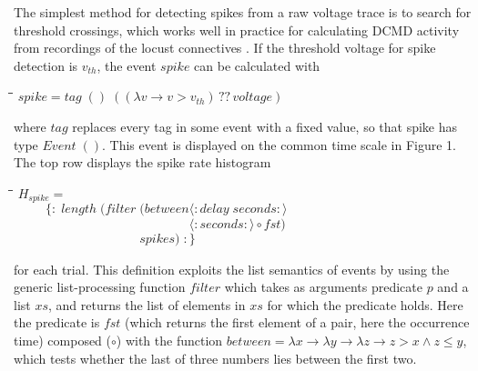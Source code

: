 \documentclass[11pt]{article}
\newlength{\lwidth}\setlength{\lwidth}{4.5cm}
\newlength{\cwidth}\setlength{\cwidth}{8mm} %
\newcommand{\Conid}[1]{\mathit{#1}}
\newcommand{\Varid}[1]{\mathit{#1}}
\renewcommand{\leq}{\leqslant}
\begin{document}
The simplest method for detecting spikes from a raw voltage trace is
to search for threshold crossings, which works well in
practice for calculating DCMD activity from recordings of the locust
connectives \citep{Gabbiani2001}. If the threshold voltage for spike
detection is \ensuremath{v_{th}}, the event \ensuremath{\Varid{spike}} can be calculated with
\begin{tabbing}
\qquad\=\hspace{\lwidth}\=\hspace{\cwidth}\=\+\kill
${\Varid{spike}\mathrel{=}\Varid{tag}\;()\;((\lambda \Varid{v}\to \Varid{v}\mathbin{>}v_{th})\,??\,\Varid{voltage})}$
\end{tabbing}where \ensuremath{\Varid{tag}} replaces every tag in some event with a fixed value, so
that spike has type \ensuremath{\Conid{Event}\;()}. This event is displayed on the common
time scale in Figure 1. The top row displays the spike rate histogram
\begin{tabbing}
\qquad\=\hspace{\lwidth}\=\hspace{\cwidth}\=\+\kill
${H_{spike}\mathrel{=}}$\\
${\phantom{H_{spike}\mbox{}}\{\!:\!\;\Varid{length}\;(\Varid{filter}\;(\Varid{between}\langle:\Varid{delay}\;\Varid{seconds}:\rangle}$\\
${\phantom{H_{spike}\mbox{}}\phantom{\{\!:\!\;\Varid{length}\;(\Varid{filter}\;(\Varid{between}\mbox{}}\langle:\Varid{seconds}:\rangle\mathbin{\circ}\Varid{fst})\;}$\\
${\phantom{H_{spike}\mbox{}}\phantom{\{\!:\!\;\Varid{length}\;(\Varid{filter}\;\mbox{}}\Varid{spikes})\;\!:\!\}}$
\end{tabbing}for each trial. This definition exploits the list semantics of events
by using the generic list-processing function \ensuremath{\Varid{filter}} which takes as
arguments predicate \ensuremath{\Varid{p}} and a list \ensuremath{\Varid{xs}}, and returns the list of
elements in \ensuremath{\Varid{xs}} for which the predicate holds. Here the predicate is
\ensuremath{\Varid{fst}} (which returns the first element of a pair, here the occurrence
time) composed (\ensuremath{\mathbin{\circ}}) with the function \ensuremath{\Varid{between}\mathrel{=}\lambda \Varid{x}\to \lambda \Varid{y}\to \lambda \Varid{z}\to \Varid{z}\mathbin{>}\Varid{x}\mathrel{\wedge}\Varid{z}\leq \Varid{y}}, which tests whether the last of three numbers lies
between the first two.
\end{document}

